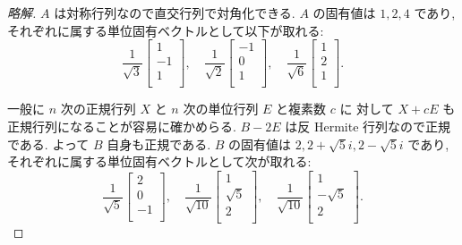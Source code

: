 \documentclass[12pt,twoside]{jarticle}
\newcommand\commentout[1]{#1}
\newcommand\commentout[1]{}
\begin{document}
\commentout{
\begin{proof}[略解]
  $A$ は対称行列なので直交行列で対角化できる.
  $A$ の固有値は $1,2,4$ であり, 
  それぞれに属する単位固有ベクトルとして以下が取れる:
  \begin{equation*}
    \frac{1}{\sqrt{3}}
    \begin{bmatrix}
      1 \\ -1 \\ 1 \\
    \end{bmatrix}, 
    \quad
    \frac{1}{\sqrt{2}}
    \begin{bmatrix}
      -1 \\ 0 \\ 1 \\
    \end{bmatrix}, 
    \quad
    \frac{1}{\sqrt{6}}
    \begin{bmatrix}
      1 \\ 2 \\ 1 \\
    \end{bmatrix}.
  \end{equation*}

  一般に $n$ 次の正規行列 $X$ と $n$ 次の単位行列 $E$ と複素数 $c$ に
  対して $X+cE$ も正規行列になることが容易に確かめらる.
  $B-2E$ は反 Hermite 行列なので正規である. 
  よって $B$ 自身も正規である.
  $B$ の固有値は $2, 2+\sqrt{5}i, 2-\sqrt{5}i$ であり,
  それぞれに属する単位固有ベクトルとして次が取れる:
  \begin{equation*}
    \frac{1}{\sqrt{5}}
    \begin{bmatrix}
      2 \\ 0 \\ -1 \\
    \end{bmatrix},
    \quad
    \frac{1}{\sqrt{10}}
    \begin{bmatrix}
      1 \\ \sqrt{5} \\ 2 \\
    \end{bmatrix},
    \quad
    \frac{1}{\sqrt{10}}
    \begin{bmatrix}
      1 \\ -\sqrt{5} \\ 2 \\
    \end{bmatrix}.
  \end{equation*}


\end{proof}}
\end{document}
